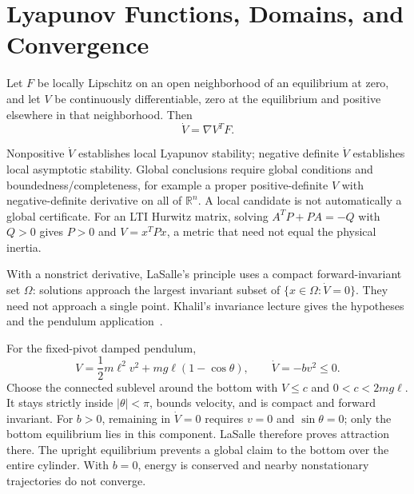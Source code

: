 \section{Lyapunov Functions, Domains, and Convergence}
\label{sec:lyapunov}
\label{def:lyapunov_function}
\label{thm:lyapunov_direct}
\label{laymans:lyapunov_altitude}
\label{pr:lyapunov_foundation}

Let $F$ be locally Lipschitz on an open neighborhood of an equilibrium at zero, and let $V$ be continuously differentiable, zero at the equilibrium and positive elsewhere in that neighborhood. Then
\begin{equation}
\label{eq:lyapunov_derivative}
 \dot V=\nabla V^TF.
\end{equation}

Nonpositive $\dot V$ establishes local Lyapunov stability; negative definite $\dot V$ establishes local asymptotic stability. Global conclusions require global conditions and boundedness/completeness, for example a proper positive-definite $V$ with negative-definite derivative on all of $\mathbb R^n$. A local candidate is not automatically a global certificate. For an LTI Hurwitz matrix, solving $A^TP+PA=-Q$ with $Q>0$ gives $P>0$ and $V=x^TPx$, a metric that need not equal the physical inertia.

With a nonstrict derivative, LaSalle's principle uses a compact forward-invariant set $\Omega$: solutions approach the largest invariant subset of $\{x\in\Omega:\dot V=0\}$. They need not approach a single point. Khalil's invariance lecture gives the hypotheses and the pendulum application~\cite{KhalilInvarianceNotes}.

For the fixed-pivot damped pendulum,
\begin{equation}
\label{eq:pendulum_lyapunov}
 V=\frac12m\ell^2v^2+mg\ell(1-\cos\theta),\qquad \dot V=-bv^2\leq0.
\end{equation}
\label{ex:lyapunov_pendulum}
\label{eq:damped_pendulum}
\label{eq:pendulum_Vdot}
Choose the connected sublevel around the bottom with $V\leq c$ and $0<c<2mg\ell$. It stays strictly inside $|\theta|<\pi$, bounds velocity, and is compact and forward invariant. For $b>0$, remaining in $\dot V=0$ requires $v=0$ and $\sin\theta=0$; only the bottom equilibrium lies in this component. LaSalle therefore proves attraction there. The upright equilibrium prevents a global claim to the bottom over the entire cylinder. With $b=0$, energy is conserved and nearby nonstationary trajectories do not converge.

